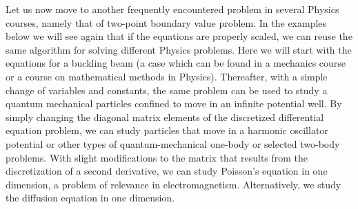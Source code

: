 \documentclass[graybox,envcountchap,sectrefs]{svmult}
\begin{document}
Let us now move to another frequently encountered problem in several
Physics courses, namely that of two-point boundary value problem. In
the examples below we will see again that if the equations are
properly scaled, we can reuse the same algorithm for solving different
Physics problems. Here we will start with the equations for a buckling
beam (a case which can be found in a mechanics course or a course on
mathematical methods in Physics). Thereafter, with a simple change of
variables and constants, the same problem can be used to study a
quantum mechanical particles confined to move in an infinite potential
well.  By simply changing the diagonal matrix elements of the
discretized differential equation problem, we can study particles that
move in a harmonic oscillator potential or other types of
quantum-mechanical one-body or selected two-body problems.  With
slight modifications to the matrix that results from the
discretization of a second derivative, we can study Poisson's equation
in one dimension, a problem of relevance in
electromagnetism. Alternatively, we study the diffusion equation in
one dimension.
\end{document}
